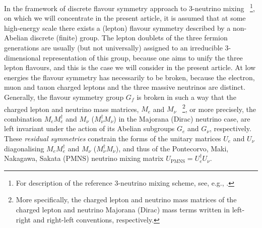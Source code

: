 \documentclass[11pt,a4paper]{article}
\numberwithin{equation}{section}
\begin{document}
 In the framework of discrete flavour symmetry 
approach to 3-neutrino mixing~%
\footnote{For description of the reference 3-neutrino mixing scheme, 
see, e.g., \cite{Patrignani:2016xqp}.},
on which we will concentrate in the present article, 
it is assumed that at some high-energy scale there 
exists a (lepton) flavour symmetry 
described by a non-Abelian discrete (finite) group. 
The  lepton doublets of the 
three fermion generations are usually 
(but not universally)
assigned to an irreducible 3-dimensional representation 
of this group, because one aims to unify the three lepton flavours, 
and this is the case we will consider in the present article. 
At low energies the flavour symmetry has necessarily to be broken,
because the electron, muon and tauon 
charged leptons and the three massive neutrinos are distinct. 
Generally, the flavour symmetry group $G_f$ is broken in such a way that
the charged lepton and neutrino mass matrices, $M_e$ and  $M_\nu$~%
\footnote{More specifically, the charged lepton and neutrino mass matrices
of the charged lepton and neutrino Majorana (Dirac) mass terms 
written in left-right and right-left conventions, respectively.},
or more precisely, the combination $M_e M_e^\dagger$ and 
$M_\nu$ ($M^\dagger_\nu M_\nu$) in the Majorana 
(Dirac) neutrino case, are left invariant 
under the action of its Abelian subgroups 
$G_e$ and $G_\nu$, respectively.  
These \textit{residual symmetries} constrain the forms of 
the unitary matrices $U_e$ and $U_\nu$ diagonalising 
$M_e M_e^\dagger$ and $M_\nu$ ($M^\dagger_\nu M_\nu$), 
and thus of the Pontecorvo, Maki, Nakagawa, Sakata (PMNS)
neutrino mixing matrix $U_\mathrm{PMNS} = U_e^\dagger U_\nu$.
\end{document}
